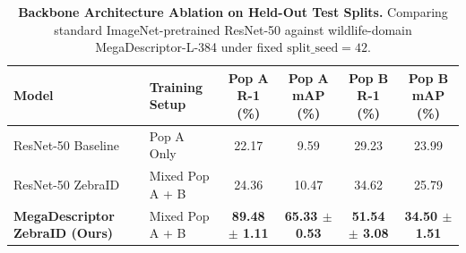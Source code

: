 \begin{table}[h]
\centering
\small
\caption{\textbf{Backbone Architecture Ablation on Held-Out Test Splits.} Comparing standard ImageNet-pretrained ResNet-50 against wildlife-domain MegaDescriptor-L-384 under fixed $\text{split\_seed}=42$.}
\label{tab:backbone_ablation}
\begin{tabular}{llcccc}
\toprule
\textbf{Model} & \textbf{Training Setup} & \textbf{Pop A R-1 (\%)} & \textbf{Pop A mAP (\%)} & \textbf{Pop B R-1 (\%)} & \textbf{Pop B mAP (\%)} \\
\midrule
ResNet-50 Baseline & Pop A Only & 22.17 & 9.59 & 29.23 & 23.99 \\
ResNet-50 ZebraID & Mixed Pop A + B & 24.36 & 10.47 & 34.62 & 25.79 \\
\textbf{MegaDescriptor ZebraID (Ours)} & Mixed Pop A + B & \textbf{89.48 $\pm$ 1.11} & \textbf{65.33 $\pm$ 0.53} & \textbf{51.54 $\pm$ 3.08} & \textbf{34.50 $\pm$ 1.51} \\
\bottomrule
\end{tabular}
\end{table}
